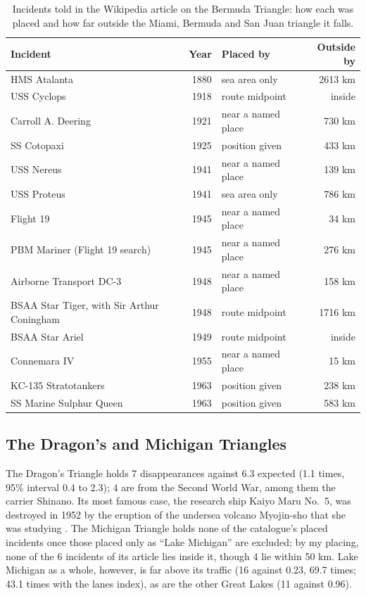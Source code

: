 \documentclass[11pt,a4paper]{article}
\begin{document}
\begin{table}[tbp]\centering\small\caption{Incidents told in the Wikipedia article on the Bermuda Triangle: how each was placed and how far outside the Miami, Bermuda and San Juan triangle it falls.}\label{tab:famous}\begin{tabular}{p{6.2cm}rp{3.4cm}r}\toprule Incident & Year & Placed by & Outside by\\\midrule
HMS Atalanta & 1880 & sea area only & 2613 km\\
USS Cyclops & 1918 & route midpoint & inside\\
Carroll A. Deering & 1921 & near a named place & 730 km\\
SS Cotopaxi & 1925 & position given & 433 km\\
USS Nereus & 1941 & near a named place & 139 km\\
USS Proteus & 1941 & sea area only & 786 km\\
Flight 19 & 1945 & near a named place & 34 km\\
PBM Mariner (Flight 19 search) & 1945 & near a named place & 276 km\\
Airborne Transport DC-3 & 1948 & near a named place & 158 km\\
BSAA Star Tiger, with Sir Arthur Coningham & 1948 & route midpoint & 1716 km\\
BSAA Star Ariel & 1949 & route midpoint & inside\\
Connemara IV & 1955 & near a named place & 15 km\\
KC-135 Stratotankers & 1963 & position given & 238 km\\
SS Marine Sulphur Queen & 1963 & position given & 583 km\\
\bottomrule\end{tabular}\end{table}

\subsection{The Dragon's and Michigan Triangles}
The Dragon's Triangle holds 7 disappearances against 6.3 expected (1.1 times, 95\% interval 0.4 to 2.3); 4 are from the Second World War, among them the carrier Shinano. Its most famous case, the research ship Kaiyo Maru No.~5, was destroyed in 1952 by the eruption of the undersea volcano Myojin-sho that she was studying \citep{wikids}. The Michigan Triangle holds none of the catalogue's placed incidents once those placed only as ``Lake Michigan'' are excluded; by my placing, none of the 6 incidents of its article lies inside it, though 4 lie within 50 km. Lake Michigan as a whole, however, is far above its traffic (16 against 0.23, 69.7 times; 43.1 times with the lanes index), as are the other Great Lakes (11 against 0.96).
\end{document}
